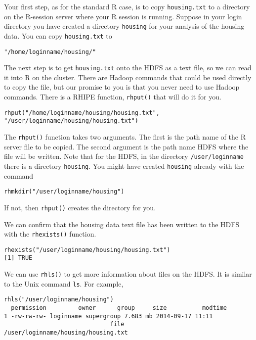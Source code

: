 Your first step, as for the standard R case, is to copy \texttt{housing.txt} to a
directory on the R-session server where your R session is running.
Suppose in your login directory you have created a directory \texttt{housing}
for your analysis of the housing data. You can copy \texttt{housing.txt} to

\begin{verbatim}
"/home/loginname/housing/"
\end{verbatim}

The next step is to get \texttt{housing.txt} onto the HDFS as a text file, so we can
read it into R on the cluster. There are Hadoop commands that could be used
directly to copy the file, but our promise to you is that you never need to
use Hadoop commands. There is a RHIPE function, \texttt{rhput()} that will do it
for you.

\begin{verbatim}
rhput("/home/loginname/housing/housing.txt", "/user/loginname/housing/housing.txt")
\end{verbatim}


The \texttt{rhput()} function takes two arguments.
The first is the path name of the R server file to be copied. The second
argument is the path name HDFS where the file will be written.
Note that for the HDFS, in the  directory \texttt{/user/loginname}
there is a directory \texttt{housing}. You might have created \texttt{housing}
already with the command

\begin{verbatim}
rhmkdir("/user/loginname/housing")
\end{verbatim}

If not, then \texttt{rhput()} creates the directory for you.

We can confirm that the housing data text file has been written to the HDFS
with the \texttt{rhexists()} function.

\begin{verbatim}
rhexists("/user/loginname/housing/housing.txt")
[1] TRUE
\end{verbatim}

We can use \texttt{rhls()} to get more information about files on the
HDFS. It is similar to the Unix command \texttt{ls}. For example,

\begin{verbatim}
rhls("/user/loginname/housing")
  permission         owner      group     size          modtime
1 -rw-rw-rw- loginname supergroup 7.683 mb 2014-09-17 11:11
                              file
/user/loginname/housing/housing.txt
\end{verbatim}

